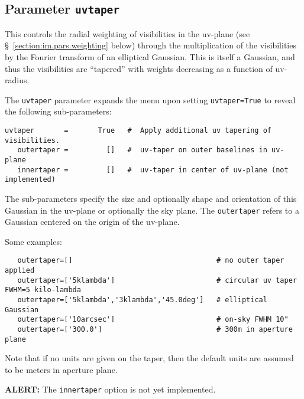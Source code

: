 \subsection{Parameter {\tt uvtaper} }
\label{section:im.pars.uvtaper}

This controls the radial weighting of visibilities in the uv-plane
(see \S~\ref{section:im.pars.weighting} below) through the multiplication
of the visibilities by the Fourier transform of an elliptical Gaussian.
This is itself a Gaussian, and thus the visibilities are ``tapered'' with
weights decreasing as a function of uv-radius.

The {\tt uvtaper} parameter expands the menu upon setting {\tt uvtaper=True} 
to reveal the following sub-parameters:
\small
\begin{verbatim}
uvtaper       =       True   #  Apply additional uv tapering of  visibilities.
   outertaper =         []   #  uv-taper on outer baselines in uv-plane
   innertaper =         []   #  uv-taper in center of uv-plane (not
implemented)
\end{verbatim}
\normalsize
The sub-parameters specify the size and optionally shape and
orientation of this Gaussian in the uv-plane or optionally the
sky plane.  The {\tt outertaper} refers to a Gaussian centered on 
the origin of the uv-plane.

Some examples:
\small
\begin{verbatim}
   outertaper=[]                                  # no outer taper applied
   outertaper=['5klambda']                        # circular uv taper FWHM=5 kilo-lambda
   outertaper=['5klambda','3klambda','45.0deg']   # elliptical Gaussian
   outertaper=['10arcsec']                        # on-sky FWHM 10"
   outertaper=['300.0']                           # 300m in aperture plane
\end{verbatim}
\normalsize
Note that if no units are given on the taper, then the default units
are assumed to be meters in aperture plane.

{\bf ALERT:} The {\tt innertaper} option is not yet implemented. 


